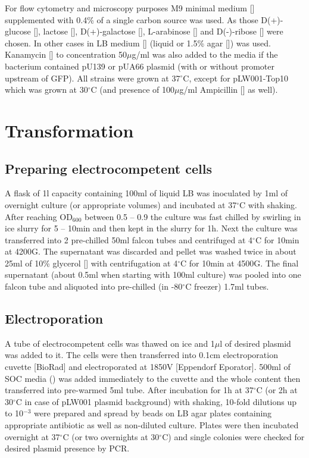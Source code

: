 For flow cytometry and microscopy purposes M9 minimal medium [] supplemented with 0.4\% of a single carbon source was used.
As those D(+)-glucose [], lactose [], D(+)-galactose [], L-arabinose [] and D(-)-ribose [] were chosen.
In other cases in LB medium [] (liquid or 1.5\% agar []) was used.
Kanamycin [] to concentration 50$\mu$g/ml was also added to the media if the bacterium contained pU139 or pUA66 plasmid (with or without promoter upstream of GFP).
All strains were grown at 37$^{\circ}$C, except for pLW001-Top10 which was grown at 30$^{\circ}$C (and presence of 100$\mu$g/ml Ampicillin [] as well).

\section{Transformation}
\subsection{Preparing electrocompetent cells}
A flask of 1l capacity containing 100ml of liquid LB was inoculated by 1ml of overnight culture (or appropriate volumes) and incubated at 37$^{\circ}$C with shaking.
After reaching OD$_{600}$ between 0.5 -- 0.9 the culture was fast chilled by swirling in ice slurry for 5 -- 10min and then kept in the slurry for 1h.
Next the culture was transferred into 2 pre-chilled 50ml falcon tubes and centrifuged  at 4$^{\circ}$C for 10min at 4200G.
The supernatant was discarded and pellet was washed twice in about 25ml of 10\% glycerol [] with centrifugation at 4$^{\circ}$C for 10min at 4500G.
The final supernatant (about 0.5ml when starting with 100ml culture) was pooled into one falcon tube and aliquoted into pre-chilled (in -80$^{\circ}$C freezer) 1.7ml tubes.

\subsection{Electroporation}
A tube of electrocompetent cells was thawed on ice and 1$\mu$l of desired plasmid was added to it.
The cells were then transferred into 0.1cm electroporation cuvette [BioRad] and electroporated at 1850V [Eppendorf Eporator\textsuperscript{\textregistered}].
500ml of SOC media () was added immediately to the cuvette and the whole content then transferred into pre-warmed 5ml tube.
After incubation for 1h at 37$^{\circ}$C (or 2h at 30$^{\circ}$C in case of pLW001 plasmid background) with shaking, 10-fold dilutions up to 10$^{-3}$ were prepared and spread by beads on LB agar plates containing appropriate antibiotic as well as non-diluted culture.
Plates were then incubated overnight at 37$^{\circ}$C (or two overnights at 30$^{\circ}$C) and single colonies were checked for desired plasmid presence by PCR.

